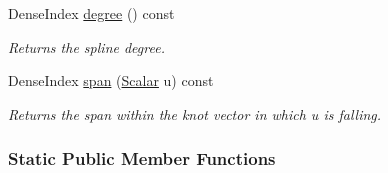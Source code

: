 \begin{DoxyCompactItemize}
Dense\+Index \hyperlink{group___splines___module_a0df23e941ac0f31dcd095a4dd4f4a7ec}{degree} () const
\begin{DoxyCompactList}\small\item\em Returns the spline degree. \end{DoxyCompactList}\item 
Dense\+Index \hyperlink{group___splines___module_ab62751802b4cc237aadb0dbf3455df98}{span} (\hyperlink{group___splines___module_a8cafd78b564825c76fbb3419653d9742}{Scalar} u) const
\begin{DoxyCompactList}\small\item\em Returns the span within the knot vector in which u is falling. \end{DoxyCompactList}\end{DoxyCompactItemize}
\subsubsection*{Static Public Member Functions}
